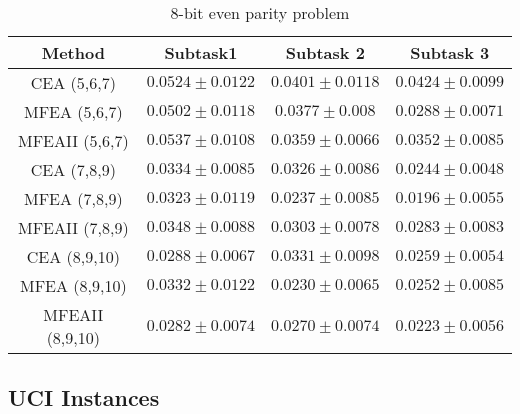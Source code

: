 \begin{table}
    \caption{8-bit even parity problem}
    \begin{center}
    \begin{tabular}{|c|c|c|c|}
    \hline
    \multirow{1}{*}{\textbf{Method}} & \multicolumn{1}{c|}{\textbf{Subtask1}} & \multicolumn{1}{c|}{\textbf{Subtask 2}} & \multicolumn{1}{c|}{\textbf{Subtask 3}} \\ \hline
    CEA (5,6,7) & $0.0524 \pm 0.0122$ & $0.0401 \pm 0.0118$ & $0.0424 \pm 0.0099$  \\ 
    MFEA (5,6,7) & $\mathbf{0.0502 \pm 0.0118}$ & $0.0377 \pm 0.008$ & $\mathbf{0.0288 \pm 0.0071}$ \\ 
    MFEAII (5,6,7)  & $0.0537 \pm 0.0108$ &$ \mathbf{0.0359 \pm 0.0066}$ &$ 0.0352 \pm 0.0085$ \\ \hline
    CEA (7,8,9) & $0.0334 \pm 0.0085$ & $0.0326 \pm 0.0086$ & $0.0244 \pm 0.0048$ \\ 
    MFEA (7,8,9) & $\mathbf{0.0323 \pm 0.0119}$ & $\mathbf{0.0237 \pm 0.0085}$ & $\mathbf{0.0196 \pm 0.0055}$ \\ 
    MFEAII (7,8,9)  & $0.0348 \pm 0.0088$ &$ 0.0303 \pm 0.0078$ &$ 0.0283 \pm 0.0083$ \\ \hline
    CEA (8,9,10)  & $0.0288 \pm 0.0067$ & $0.0331 \pm 0.0098$& $0.0259 \pm 0.0054$ \\ 
    MFEA (8,9,10)  & $0.0332 \pm 0.0122$ & $\mathbf{0.0230 \pm 0.0065}$ & $ 0.0252 \pm 0.0085$ \\ 
    MFEAII (8,9,10)  & $\mathbf{0.0282 \pm 0.0074}$ & $0.0270 \pm 0.0074$& $\mathbf{0.0223 \pm 0.0056}$ \\ \hline
    
    \end{tabular}
    \end{center}
    
    \label{tab:result:nbit}
\end{table}
\subsection{UCI Instances}


